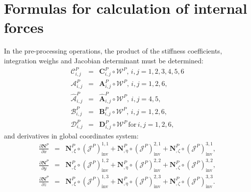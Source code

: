 

\chapter{Formulas for calculation of internal forces}
\label{app:fu}

In the pre-processing operations, the product of the stiffness coefficients, integration weighs and Jacobian determinant must be determined:
\begin{eqnarray}
	\mathcal{C}^P_{i,j} &=& \textbf{C}^P_{i,j}\circ\mathcal{W}^P,\,i,j=1,2,3,4,5,6\\
	\mathcal{A}^P_{i,j} &=& \textbf{A}^P_{i,j}\circ\mathcal{W}^P,\,i,j=1,2,6,\\
	\hat{\mathcal{A}}^P_{i,j} &=& \hat{\textbf{A}}^P_{i,j}\circ\mathcal{W}^P,\,i,j=4,5,\\
	\mathcal{B}^P_{i,j} &=& \textbf{B}^P_{i,j}\circ\mathcal{W}^P,\,i,j=1,2,6,\\
	\mathcal{D}^P_{i,j} &=& \textbf{D}^P_{i,j}\circ\mathcal{W}^P\, \mathrm{for}\, i,j=1,2,6,
\end{eqnarray}
and derivatives in global coordinates system:
\begin{eqnarray}
\frac{\partial \textbf{N}^P}{\partial x} &=& \textbf{N}^P_{,\xi}\circ\left(\mathcal{J}^P\right)^{1,1}_{\mathrm{inv}} + \textbf{N}^P_{,\eta}\circ\left(\mathcal{J}^P\right)^{2,1}_{\mathrm{inv}} + \textbf{N}^P_{,\zeta}\circ\left(\mathcal{J}^P\right)^{3,1}_{\mathrm{inv}},\\
\frac{\partial \textbf{N}^P}{\partial y} &=& \textbf{N}^P_{,\xi}\circ\left(\mathcal{J}^P\right)^{1,2}_{\mathrm{inv}} + \textbf{N}^P_{,\eta}\circ\left(\mathcal{J}^P\right)^{2,2}_{\mathrm{inv}} + \textbf{N}^P_{,\zeta}\circ\left(\mathcal{J}^P\right)^{3,2}_{\mathrm{inv}},\\
\frac{\partial \textbf{N}^P}{\partial z} &=& \textbf{N}^P_{,\xi}\circ\left(\mathcal{J}^P\right)^{1,3}_{\mathrm{inv}} + \textbf{N}^P_{,\eta}\circ\left(\mathcal{J}^P\right)^{2,3}_{\mathrm{inv}} + \textbf{N}^P_{,\zeta}\circ\left(\mathcal{J}^P\right)^{3,3}_{\mathrm{inv}}.
\end{eqnarray}

